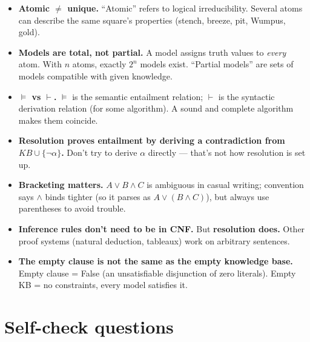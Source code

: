 \documentclass[11pt, a4paper]{article}
\begin{document}
\begin{itemize}
  \item \textbf{Atomic $\ne$ unique.} ``Atomic'' refers to logical irreducibility. Several atoms can describe the same square's properties (stench, breeze, pit, Wumpus, gold).
  \item \textbf{Models are total, not partial.} A model assigns truth values to \emph{every} atom. With $n$ atoms, exactly $2^n$ models exist. ``Partial models'' are sets of models compatible with given knowledge.
  \item \textbf{$\models$ vs $\vdash$.} $\models$ is the semantic entailment relation; $\vdash$ is the syntactic derivation relation (for some algorithm). A sound and complete algorithm makes them coincide.
  \item \textbf{Resolution proves entailment by deriving a contradiction from $KB \cup \{\neg\alpha\}$.} Don't try to derive $\alpha$ directly — that's not how resolution is set up.
  \item \textbf{Bracketing matters.} $A \lor B \land C$ is ambiguous in casual writing; convention says $\land$ binds tighter (so it parses as $A \lor (B \land C)$), but always use parentheses to avoid trouble.
  \item \textbf{Inference rules don't need to be in CNF.} But \textbf{resolution does.} Other proof systems (natural deduction, tableaux) work on arbitrary sentences.
  \item \textbf{The empty clause is not the same as the empty knowledge base.} Empty clause = False (an unsatisfiable disjunction of zero literals). Empty KB = no constraints, every model satisfies it.
\end{itemize}

\section*{Self-check questions}
\end{document}
